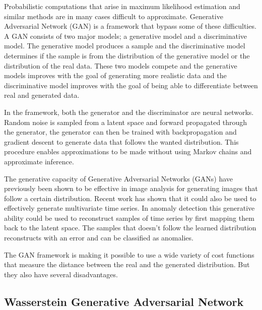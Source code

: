 
Probabilistic computations that arise in maximum likelihood estimation and similar methods are in many cases difficult to approximate. Generative Adversarial Network (GAN) is a framework that bypass some of these difficulties. A GAN consists of two major models; a generative model and a discriminative model. The generative model produces a sample and the discriminative model determines if the sample is from the distribution of the generative model or the distribution of the real data. These two models compete and the generative models improves with the goal of generating more realistic data and the discriminative model improves with the goal of being able to differentiate between real and generated data. 

In the framework, both the generator and the discriminator are neural networks. Random noise is sampled from a latent space and forward propagated through the generator, the generator can then be trained with backpropagation and gradient descent to generate data that follows the wanted distribution. This procedure enables approximations to be made without using Markov chains and approximate inference.  

The generative capacity of Generative Adversarial Networks (GANs) have previously been shown to be effective in image analysis for generating images that follow a certain distribution. Recent work has shown that it could also be used to effectively generate multivariate time series. In anomaly detection this generative ability could be used to reconstruct samples of time series by first mapping them back to the latent space. The samples that doesn't follow the learned distribution reconstructs with an error and can be classified as anomalies. 

The GAN framework is making it possible to use a wide variety of cost functions that measure the distance between the real and the generated distribution. But they also have several disadvantages. 







\subsection{Wasserstein Generative Adversarial Network}

